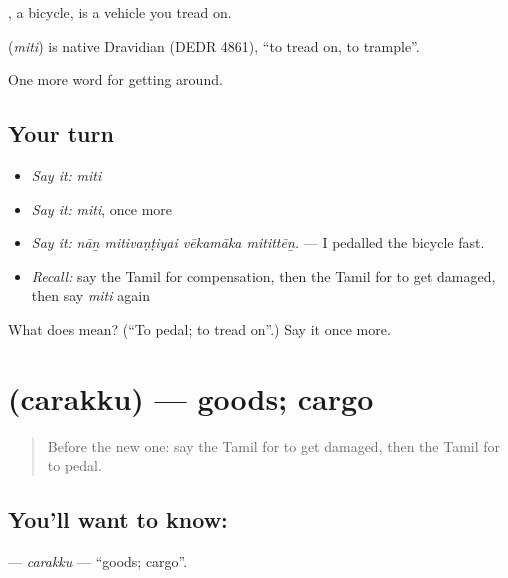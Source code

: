 , a bicycle, is a vehicle you tread on.

\begin{cousinweb}
\textbf{} (\emph{miti}) is native Dravidian (DEDR 4861), \textquotedblleft{}to tread on, to trample\textquotedblright{}.
\end{cousinweb}

\begin{grammarlens}[title={What you've built}]
One more word for getting around.
\end{grammarlens}

\subsection*{Your turn}
\begin{itemize}
\raggedright
  \item \emph{Say it:} \emph{miti}
  \item \emph{Say it:} \emph{miti}, once more
  \item \emph{Say it:} \emph{nāṉ mitivaṇṭiyai vēkamāka mitittēṉ.} — I pedalled the bicycle fast.
  \item \emph{Recall:} say the Tamil for compensation, then the Tamil for to get damaged, then say \emph{miti} again
\end{itemize}

\begin{tcolorbox}[breakable,colback=teal!4,colframe=teal!35!black,title={Before you move on}]
What does  mean? (\textquotedblleft{}To pedal; to tread on\textquotedblright{}.) Say it once more.
\end{tcolorbox}
\section[\texorpdfstring{\ta{சரக்கு} (carakku)}{சரக்கு (carakku)}]{ (carakku) — goods; cargo}

\label{lesson:TA-C452-carakku}



\begin{quote}
Before the new one: say the Tamil for to get damaged, then the Tamil for to pedal.
\end{quote}

\subsection*{You'll want to know: }
\textbf{} — \emph{carakku} — \textquotedblleft{}goods; cargo\textquotedblright{}.

